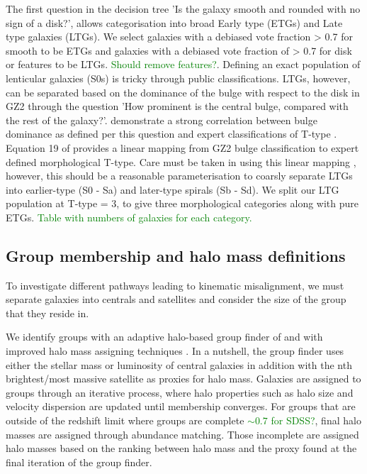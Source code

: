 \documentclass[fleqn,usenatbib]{mnras}
\newcommand{\green}[1]{{\textcolor{green}{#1}}}
\begin{document}
The first question in the decision tree 'Is the galaxy smooth and rounded with no sign of a disk?', allows categorisation into broad Early type (ETGs) and Late type galaxies (LTGs). We select galaxies with a debiased vote fraction > 0.7 for smooth to be ETGs and galaxies with a debiased vote fraction of > 0.7 for disk or features to be LTGs. \green{Should remove features?}. Defining an exact population of lenticular galaxies (S0s) is tricky through public classifications. LTGs, however, can be separated based on the dominance of the bulge with respect to the disk in GZ2 through the question 'How prominent is the central bulge, compared with the rest of the galaxy?'. \citep{willett2013} demonstrate a strong correlation between bulge dominance as defined per this question and expert classifications of T-type \citep{nair2010}. Equation 19 of \citet{willett2013} provides a linear mapping from GZ2 bulge classification to expert defined morphological T-type. Care must be taken in using this linear mapping \citep[see discussion in][]{willett2013}, however, this should be a reasonable parameterisation to coarsly separate LTGs into earlier-type (S0 - Sa) and later-type spirals (Sb - Sd). We split our LTG population at T-type = 3, to give three morphological categories along with pure ETGs. \green{Table with numbers of galaxies for each category.}

\subsection{Group membership and halo mass definitions}
To investigate different pathways leading to kinematic misalignment, we must separate galaxies into centrals and satellites and consider the size of the group that they reside in. 

We identify groups with an adaptive halo-based group finder of \citet{yang2005,yang2007} and with improved halo mass assigning techniques \citep[see;][for details and application to SDSS]{lim2017}. In a nutshell, the group finder uses either the stellar mass or luminosity of central galaxies in addition with the nth brightest/most massive satellite as proxies for halo mass. Galaxies are assigned to groups through an iterative process, where halo properties such as halo size and velocity dispersion are updated until membership converges. For groups that are outside of the redshift limit where groups are complete \green{$\sim 0.7$ for SDSS?}, final halo masses are assigned through abundance matching. Those incomplete are assigned halo masses based on the ranking between halo mass and the proxy found at the final iteration of the group finder.
\end{document}
